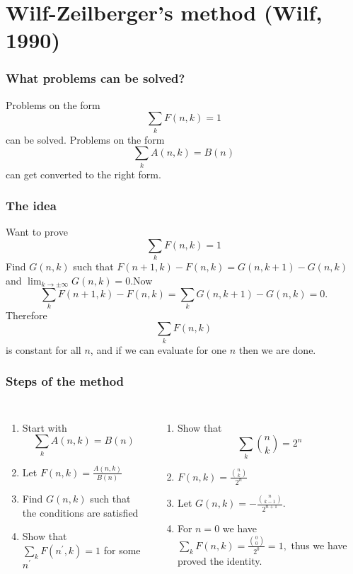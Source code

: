 \documentclass{beamer}
\begin{document}
\section[Wilf-Zeilberger's method]{Wilf-Zeilberger's method (Wilf, 1990)}
\begin{frame}
  \frametitle{What problems can be solved?}
  Problems on the form
  $$\sum_k F(n,k)=1$$
  can be solved.
  \pause
  Problems on the form
  $$\sum_k A(n,k)=B(n)$$
  can get converted to the right form.
\end{frame}
\begin{frame}
  \frametitle{The idea}
  Want to prove
  \begin{equation*}\label{Eq: WZ1}
    \sum_k F(n,k)=1
  \end{equation*}
  \pause
  Find $G(n,k)$ such that $F(n+1,k)-F(n,k)=G(n,k+1)-G(n,k)$ and $\lim_{k\to\pm\infty} G(n,k)=0$.\pause Now $$\sum_k F(n+1,k)-F(n,k)=\sum_k G(n,k+1)-G(n,k)=0.$$\pause Therefore $$\sum_k F(n,k)$$ is constant for all $n$, and if we can evaluate for one $n$ then we are done.
\end{frame}
\begin{frame}
  \frametitle{Steps of the method}
  \begin{columns}[t]

  \begin{enumerate}
    \item<1-> Start with $$\sum_k A(n,k)=B(n)$$
    \item<3-> Let $F(n,k)=\frac{A(n,k)}{B(n)}$
    \item<5-> Find $G(n,k)$ such that the conditions are satisfied
    \item<7-> Show that $\sum_k F(n^\prime,k)=1$ for some $n^\prime$
  \end{enumerate}

  \begin{enumerate}
    \item<2-> Show that $$\sum_k \binom{n}{k}=2^n$$
    \item<4-> $F(n,k)=\frac{\binom{n}{k}}{2^n}$
    \item<6-> Let $G(n,k)=-\frac{\binom{n}{k-1}}{2^{n+1}}.$
    \item<8-> For $n=0$ we have $\sum_k F(n,k)=\frac{\binom{0}{0}}{2^0}=1,$ thus we have proved the identity.
  \end{enumerate}
  \end{columns}
\end{frame}
\end{document}
